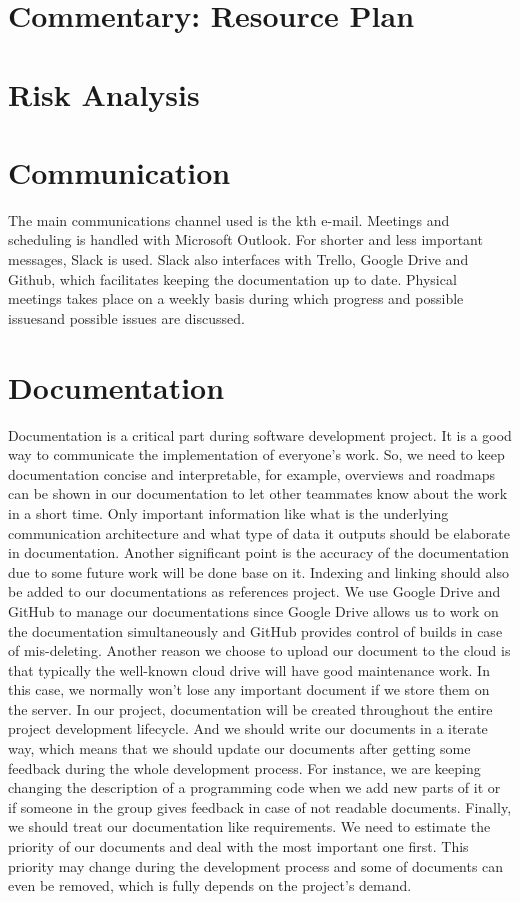 \documentclass[11pt, titlepage]{article} %
\begin{document}
\section{Commentary: Resource Plan}
\section{Risk Analysis}
\section{Communication}
The main communications channel used is the kth e-mail. Meetings and
scheduling is handled with Microsoft Outlook. For shorter and less
important messages, Slack is used. Slack also interfaces with 
Trello, Google Drive and Github, which facilitates keeping the
documentation up to date. Physical meetings takes place on a
weekly basis during which progress and possible issuesand possible issues are discussed.

\section{Documentation}
Documentation is a critical part during software development project. It is
a good way to communicate the implementation of everyone's work. So, we
need to keep documentation concise and interpretable, for example, overviews
and roadmaps can be shown in our documentation to let other teammates
know about the work in a short time. Only important information like what is
the underlying communication architecture and what type of data it outputs
should be elaborate in documentation. Another significant point is the
accuracy of the documentation due to some future work will be done base on
it. Indexing and linking should also be added to our documentations as
references project.
We use Google Drive and GitHub to manage our documentations since
Google Drive allows us to work on the documentation simultaneously and
GitHub provides control of builds in case of mis-deleting. Another reason we
choose to upload our document to the cloud is that typically the well-known
cloud drive will have good maintenance work. In this case, we normally won’t
lose any important document if we store them on the server.
In our project, documentation will be created throughout the entire project
development lifecycle. And we should write our documents in a iterate way,
which means that we should update our documents after getting some
feedback during the whole development process. For instance, we are
keeping changing the description of a programming code when we add new
parts of it or if someone in the group gives feedback in case of not
readable documents. Finally, we should treat our documentation like
requirements. We need to estimate the priority of our documents and deal
with the most important one first. This priority may change during the
development process and some of documents can even be removed, which
is fully depends on the project's demand.
\end{document}
